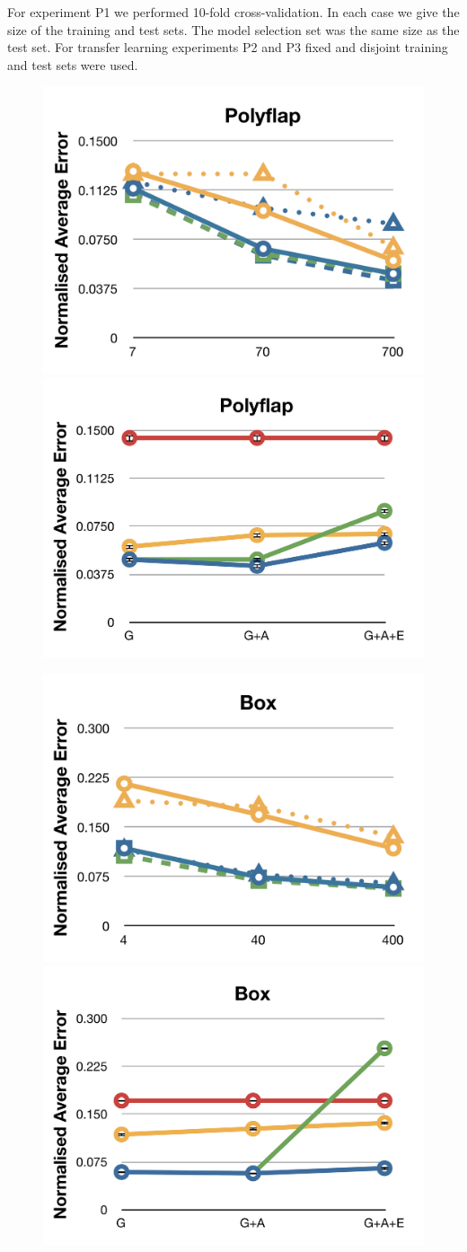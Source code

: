
For experiment P1 we performed 10-fold cross-validation. In each case
we give the size of the training and test sets. The model selection
set was the same size as the test set. For transfer learning
experiments P2 and P3 fixed and disjoint training and test sets were used.

\begin{figure}[t]

\centerline{
\includegraphics[width=0.45\columnwidth]{graphs_jw/L1av_graph}
\includegraphics[width=0.45\columnwidth]{graphs_jw/L1av_graph_polyflap}
}

\centerline{
\includegraphics[width=0.45\columnwidth]{graphs_jw/L2av_graph}
\includegraphics[width=0.45\columnwidth]{graphs_jw/L1av_graph_box}
}


\end{figure}
